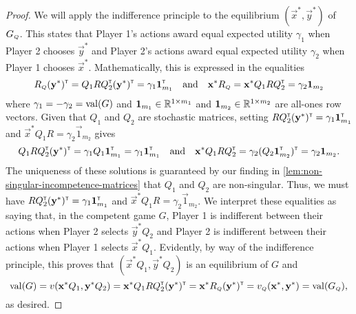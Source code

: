     \begin{proof}
        We will apply the indifference principle to the equilibrium $(\vec{x}^*, \vec{y}^*)$ of $G_\ms{Q}$.
        This states that Player 1's actions award equal expected utility $\gamma_1$ when Player 2 chooses $\vec{y}^*$ and Player 2's actions award equal expected utility $\gamma_2$ when Player 1 chooses $\vec{x}^*$.
        Mathematically, this is expressed in the equalities
        \begin{equation} \label{temp:competent-game-equilibrium-1}
            R_\ms{Q} (\vec{y}^*)^\transp
                = Q_1 R Q_2^\transp (\vec{y}^*)^\transp
                = \gamma_1 \vec{1}_{m_1}^\transp
            \quad\text{and}\quad
            \vec{x}^* R_\ms{Q}
                = \vec{x}^* Q_1 R Q_2^\transp
                = \gamma_2 \vec{1}_{m_2}
        \end{equation}
        where $\gamma_1 = -\gamma_2 = \operatorname{val}(G)$ and $\mathbf{1}_{m_1} \in \mathbb{R}^{1 \times m_1}$ and $\mathbf{1}_{m_2} \in \mathbb{R}^{1 \times m_2}$ are all-ones row vectors.
        Given that $Q_1$ and $Q_2$ are stochastic matrices, setting $R Q_2^{\scriptscriptstyle \mathsf{T}} (\mathbf{y}^*)^{\scriptscriptstyle \mathsf{T}} = \gamma_1 \mathbf{1}_{m_1}^{\scriptscriptstyle \mathsf{T}}$ and $\vec{x}^* Q_1 R = \gamma_2 \vec{1}_{m_2}$ gives
        \begin{equation} \label{temp:competent-game-equilibrium-2}
            Q_1 R Q_2^{\scriptscriptstyle \mathsf{T}} (\mathbf{y}^*)^{\scriptscriptstyle \mathsf{T}}
                = \gamma_1 Q_1 \mathbf{1}_{m_1}^{\scriptscriptstyle \mathsf{T}}
                = \gamma_1 \mathbf{1}_{m_1}^{\scriptscriptstyle \mathsf{T}}
            \quad\text{and}\quad
            \mathbf{x}^* Q_1 R Q_2^{\scriptscriptstyle \mathsf{T}}
                = \gamma_2 (Q_2 \mathbf{1}_{m_2}^{\scriptscriptstyle \mathsf{T}})^{\scriptscriptstyle \mathsf{T}}
                = \gamma_2 \mathbf{1}_{m_2}.
        \end{equation}
        The uniqueness of these solutions is guaranteed by our finding in \autoref{lem:non-singular-incompetence-matrices} that $Q_1$ and $Q_2$ are non-singular.
        Thus, we must have $R Q_2^{\scriptscriptstyle \mathsf{T}} (\mathbf{y}^*)^{\scriptscriptstyle \mathsf{T}} = \gamma_1 \mathbf{1}_{m_1}^{\scriptscriptstyle \mathsf{T}}$ and $\vec{x}^* Q_1 R = \gamma_2 \vec{1}_{m_2}$.
        We interpret these equalities as saying that, in the competent game $G$, Player 1 is indifferent between their actions when Player 2 selects $\vec{y}^* Q_2$ and Player 2 is indifferent between their actions when Player 1 selects $\vec{x}^* Q_1$.
        Evidently, by way of the indifference principle, this proves that $(\vec{x}^* Q_1, \vec{y}^* Q_2)$ is an equilibrium of $G$ and
        \begin{equation} \label{eq:temp:competent-game-equilibrium-3}
            \val(G)
                = v(\vec{x}^* Q_1, \vec{y}^* Q_2)
                = \vec{x}^* Q_1 R Q_2^\transp (\vec{y}^*)^\transp
                = \vec{x}^* R_\ms{Q} (\vec{y}^*)^\transp
                = v_\ms{Q}(\vec{x}^*, \vec{y}^*)
                = \val(G_\ms{Q}),
        \end{equation}
        as desired.
    \end{proof}

